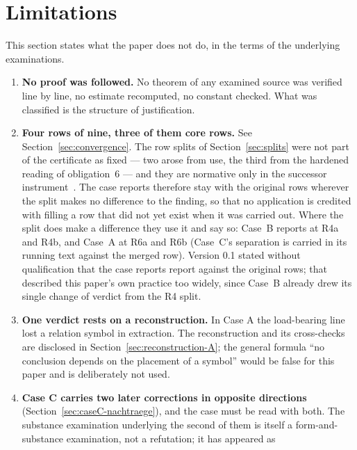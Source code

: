 \documentclass[11pt,a4paper]{article}
\theoremstyle{definition}
\begin{document}
\section{Limitations}
\label{sec:limitations}

This section states what the paper does not do, in the terms of the underlying
examinations.

\begin{enumerate}
\item \textbf{No proof was followed.} No theorem of any examined source was
  verified line by line, no estimate recomputed, no constant checked. What was
  classified is the structure of justification.
\item \textbf{Four rows of nine, three of them core rows.} See
  Section~\ref{sec:convergence}. The row splits of Section~\ref{sec:splits} were
  not part of the certificate as fixed --- two arose from use, the third from the
  hardened reading of obligation~6 --- and they are normative only in the
  successor instrument~\cite{GeigerBCM2026}. The case reports therefore stay with
  the original rows wherever the split makes no difference to the finding, so
  that no application is credited with filling a row that did not yet exist when
  it was carried out. Where the split does make a difference they use it and say
  so: Case~B reports at R4a and R4b, and Case~A at R6a and R6b (Case~C's
  separation is carried in its running text against the merged row). Version 0.1
  stated without qualification that the case reports report against the original
  rows; that described this paper's own practice too widely, since Case~B already
  drew its single change of verdict from the R4 split.
\item \textbf{One verdict rests on a reconstruction.} In Case A the load-bearing
  line lost a relation symbol in extraction. The reconstruction and its
  cross-checks are disclosed in Section~\ref{sec:reconstruction-A}; the general
  formula ``no conclusion depends on the placement of a symbol'' would be false
  for this paper and is deliberately not used.
\item \textbf{Case C carries two later corrections in opposite directions}
  (Section~\ref{sec:caseC-nachtraege}), and the case must be read with both. The
  substance examination underlying the second of them is itself a
  form-and-substance examination, not a refutation; it has appeared as

\end{enumerate}
\end{document}
